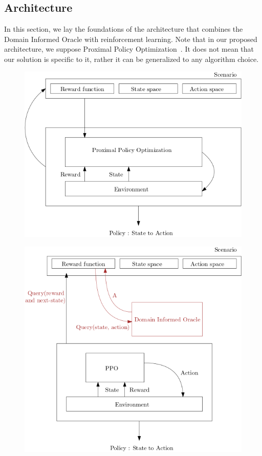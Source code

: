 \subsection{Architecture}
In this section, we lay the foundations of the architecture that combines the Domain Informed Oracle with 
reinforcement learning. Note that in our proposed architecture, we suppose Proximal Policy Optimization~\cite{schulman17ppo}. 
It does not mean that our solution is specific to it, rather it can be generalized to any algorithm choice.

\begin{figure}[H]
  \centering
  \begin{minipage}{.5\textwidth}
    \centering
    \includegraphics[width=1\linewidth]{figures/basicrl.png}
    \label{fig:basicrl}
  \end{minipage}%
  \begin{minipage}{.45\textwidth}
    \centering
    \includegraphics[width=1\linewidth]{figures/dio.png}

\end{minipage}
\end{figure}

